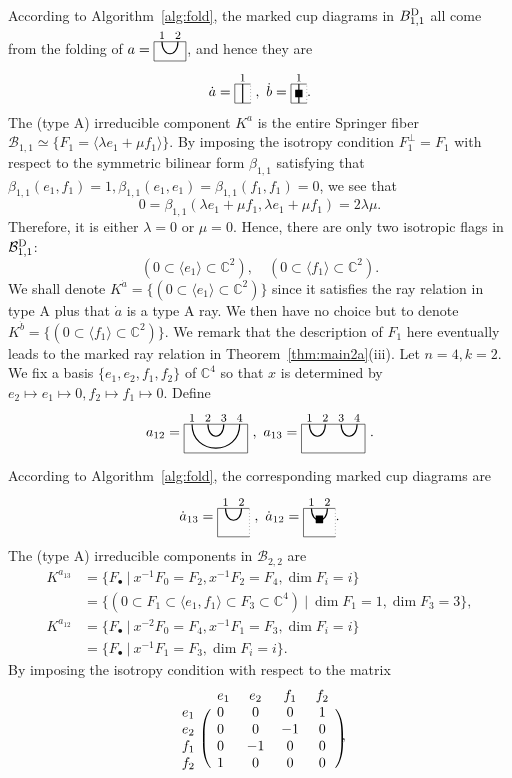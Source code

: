 \documentclass[11pt,reqno]{amsart}
\numberwithin{equation}{section}
\theoremstyle{definition}
\def\<{\langle}
\def\>{\rangle}
\newcommand{\BD}{{B}^\textup{D}}
\newcommand{\cB}{\mathcal{B}}
\newcommand{\cBD}{\mathcal{B}^\textup{D}}\newcommand{\CC}{\mathbb{C}}
\newcommand{\da}{\dot{a}}
\newcommand{\inv}{^{-1}}
\newcommand{\ld}{\lambda}
\newcommand{\cupaa}{\begin{tikzpicture}[baseline={(0,-.3)}, scale = 0.8]
\draw (-.25,0) -- (1.75,0) -- (1.75,-.9) -- (-.25,-.9) -- cycle;
\begin{footnotesize}
\node at (0,.2) {$1$};
\node at (.5,.2) {$2$};
\node at (1,.2) {$3$};
\node at (1.5,.2) {$4$};
\end{footnotesize}
\draw[thick] (0.5,0) .. controls +(0,-.5) and +(0,-.5) .. +(.5,0);
\draw[thick] (0,0) .. controls +(0,-1) and +(0,-1) .. +(1.5,0);
\end{tikzpicture}
}
\newcommand{\cupab}{\begin{tikzpicture}[baseline={(0,-.3)}, scale = 0.8]
\draw (-.25,0) -- (1.75,0) -- (1.75,-.9) -- (-.25,-.9) -- cycle;
\begin{footnotesize}
\node at (0,.2) {$1$};
\node at (.5,.2) {$2$};
\node at (1,.2) {$3$};
\node at (1.5,.2) {$4$};
\end{footnotesize}
\draw[thick] (0,0) .. controls +(0,-.5) and +(0,-.5) .. +(.5,0);
\draw[thick] (1,0) .. controls +(0,-.5) and +(0,-.5) .. +(.5,0);
\end{tikzpicture}
}
\newcommand{\mcupaa}{
\begin{tikzpicture}[baseline={(0,-.3)}, scale = 0.8]
\draw (1.75,0) -- (0.75,0) -- (0.75,-.9) -- (1.75,-.9);
\draw[dotted] (1.75,-.9) -- (1.75,0);\begin{footnotesize}
\node at (1.5,.2) {$2$};
\node at (1,.2) {$1$};
\node at (1.25, -.35) {$\blacksquare$};
\end{footnotesize}
\draw[thick] (1,0) .. controls +(0,-.5) and +(0,-.5) .. +(.5,0);
\end{tikzpicture}
}
\newcommand{\mcupab}{
\begin{tikzpicture}[baseline={(0,-.3)}, scale = 0.8]
\draw (1.75,0) -- (0.75,0) -- (0.75,-.9) -- (1.75,-.9);
\draw[dotted] (1.75,-.9) -- (1.75,0);\begin{footnotesize}
\node at (1.5,.2) {$2$};
\node at (1,.2) {$1$};
\end{footnotesize}
\draw[thick] (1,0) .. controls +(0,-.5) and +(0,-.5) .. +(.5,0);
\end{tikzpicture}
}
\newcommand{\cupaaa}{
\begin{tikzpicture}[baseline={(0,-.3)}, scale = 0.8]
\draw (1.75,0) -- (0.75,0) -- (0.75,-.6) -- (1.75,-.6);
\draw (1.75,-.6) -- (1.75,0);\begin{footnotesize}
\node at (1.5,.2) {$2$};
\node at (1,.2) {$1$};
\end{footnotesize}
\draw[thick] (1,0) .. controls +(0,-.5) and +(0,-.5) .. +(.5,0);
\end{tikzpicture}
}
\newcommand{\mcupaaa}{
\begin{tikzpicture}[baseline={(0,-.3)}, scale = 0.8]
\draw (1.25,0) -- (0.75,0) -- (0.75,-.6) -- (1.25,-.6);
\draw[dotted] (1.25,-.6) -- (1.25,0);\begin{footnotesize}
\node at (1,.2) {$1$};
\end{footnotesize}
\draw[thick] (1,0) -- (1, -.6);
\end{tikzpicture}
}
\newcommand{\mcupaab}{
\begin{tikzpicture}[baseline={(0,-.3)}, scale = 0.8]
\draw (1.25,0) -- (0.75,0) -- (0.75,-.6) -- (1.25,-.6);
\draw[dotted] (1.25,-.6) -- (1.25,0);\begin{footnotesize}
\node at (1,.2) {$1$};
\node at (1, -.3) {$\blacksquare$};
\end{footnotesize}
\draw[thick] (1,0) -- (1, -.6);
\end{tikzpicture}
}
\begin{document}
According to Algorithm~\ref{alg:fold}, the marked cup diagrams in $\BD_{1,1}$ all come from the folding of $a=\cupaaa$, and hence they are
\[
\da = \mcupaaa~,~ \dot{b} = \mcupaab.
\]
The (type A) irreducible component $K^a$ is the entire Springer fiber $\cB_{1,1} \simeq \{F_1 = \<\ld e_1+\mu f_1\>\}$. By imposing the isotropy condition $F_1^\perp = F_1$ with respect to the symmetric bilinear form $\beta_{1,1}$ satisfying that $\beta_{1,1}(e_1, f_1) = 1, \beta_{1,1}(e_1,e_1) = \beta_{1,1}(f_1,f_1)=0$, 
we see that
\[
0 = \beta_{1,1}(\ld e_1+ \mu f_1 , \ld e_1+ \mu f_1) = 2\ld\mu.
\]
Therefore, it is either $\ld=0$ or $\mu=0$. Hence, there are only two isotropic flags in $\cBD_{1,1}$:
\[
(0 \subset \<e_1\> \subset \CC^2)
,
\quad
(0 \subset \<f_1\> \subset \CC^2).
\] 
We shall denote $K^{\da} = \{(0 \subset \<e_1\> \subset \CC^2)\}$ since it satisfies the ray relation in type A plus that $\da$ is a type A ray. 
We then have no choice but to denote $K^{\dot{b}} = \{(0 \subset \<f_1\> \subset \CC^2)\}$.
We remark that the description of $F_1$ here eventually leads to the marked ray relation in  Theorem~\ref{thm:main2a}(iii). 
\endex
\ex\label{ex:Ka22}
Let $n=4, k=2$. We fix a basis $\{e_1, e_2, f_1, f_2\}$ of $\CC^4$ so that $x$ is determined by
$e_2 \mapsto e_1 \mapsto 0, f_2 \mapsto f_1 \mapsto 0$.
Define
\[
a_{12} = \cupaa~,~ a_{13}= \cupab~.
\]
According to Algorithm~\ref{alg:fold}, the corresponding marked cup diagrams are
\[
\da_{13} = \mcupab~,~\da_{12} = \mcupaa.
\]
The (type A) irreducible components in $\cB_{2,2}$ are 
\[
\begin{split}
K^{a_{13}} 
&= \{F_\bullet ~|~ x\inv F_0 = F_2, x\inv F_2 = F_4, \dim F_i = i\}
\\
&= \{(0 \subset F_1 \subset \<e_1, f_1\> \subset F_3 \subset \CC^4) ~|~ \dim F_1 = 1, \dim F_3=3\},
\\
K^{a_{12}} 
&= \{F_\bullet ~|~ x^{-2} F_0 = F_4, x\inv F_1 = F_3, \dim F_i = i\}
\\
&= \{ F_\bullet ~|~ x\inv F_1 = F_3, \dim F_i = i\}. 
\end{split}
\]
By imposing the isotropy condition with respect to the matrix
\[
\begin{blockarray}{ *{8}{c} }
& e_1 &   e_2 & f_1 & f_2\\
\begin{block}{ c @{\quad} ( @{\,} *{7}{c} @{\,} ) }
e_1 & 0 & 0 & 0& 1 \\
e_2 & 0 & 0 & -1 & 0   \\
f_1 & 0 & -1 & 0 &0\\
f_2 & 1 & 0 & 0 &0\\
\end{block}
\end{blockarray}~~~~~,
\]
\end{document}
